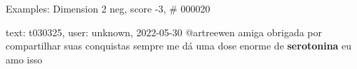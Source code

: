 \begin{frame}{Examples: Dimension 2 neg, score -3, \# 000020}
\footnotesize
\begin{alertblock}{text: t030325, user: unknown, 2022-05-30}
@artreewen amiga obrigada por compartilhar suas conquistas sempre me dá uma 
dose enorme de \textbf{serotonina} eu amo isso  
 🥹🥹   
   
 \textbf{} 
\textbf{} 
\end{alertblock}
\end{frame}
